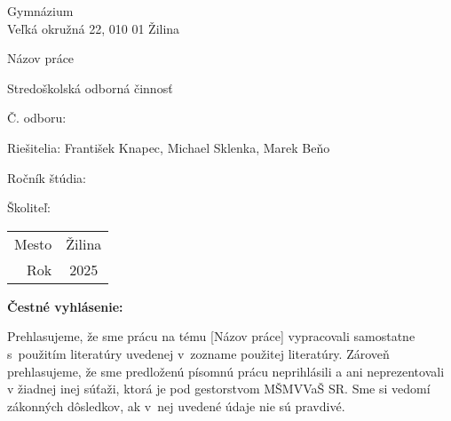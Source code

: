 \documentclass[12pt]{article}
\begin{document}
\begin{titlepage}
    \setlength{\parindent}{0pt}

    \begin{center}
        Gymnázium \\
        Veľká okružná 22, 010 01 Žilina

        \vspace{7cm}
        \Huge Názov práce

        \vspace{1.13cm}
        \Large Stredoškolská odborná činnosť

        \vspace{2.12cm}
        \normalsize Č. odboru:
    \end{center}

    \vfill

    \begin{minipage}{0.75\textwidth}
        Riešitelia: František Knapec, Michael Sklenka, Marek Beňo \par
        Ročník štúdia: \par
        Školiteľ:
    \end{minipage}
    \hfill
    \begin{minipage}{0.2\textwidth}
        \hfil %
        \begin{tabular}{r@{: }c}
            Mesto & Žilina \\
            Rok   & 2025
        \end{tabular}
    \end{minipage}
\end{titlepage}

\setcounter{page}{3}

%
%

\thispagestyle{empty}

\noindent
\textbf{Čestné vyhlásenie:}

\noindent
Prehlasujeme, že sme prácu na tému
[Názov práce] %
vypracovali samostatne s~použitím literatúry uvedenej v~zozname použitej literatúry.
Zároveň prehlasujeme, že sme predloženú písomnú prácu neprihlásili a ani neprezentovali
v žiadnej inej súťaži, ktorá je pod gestorstvom MŠMVVaŠ SR. Sme si vedomí zákonných dôsledkov,
ak v~nej uvedené údaje nie sú pravdivé.

\newpage


%
%

\thispagestyle{empty}
\end{document}
